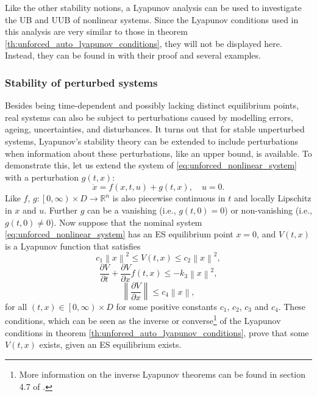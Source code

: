 Like the other stability notions, a Lyapunov analysis can be used to investigate the UB and UUB of nonlinear systems. Since the Lyapunov conditions used in this analysis are very similar to those in theorem \ref{th:unforced_auto_lyapunov_conditions}, they will not be displayed here. Instead, they can be found in \cite{khalilNonlinearControl2015} with their proof and several examples.

\subsubsection{Stability of perturbed systems}

Besides being time-dependent and possibly lacking distinct equilibrium points, real systems can also be subject to perturbations caused by modelling errors, ageing, uncertainties, and disturbances. It turns out that for stable unperturbed systems, Lyapunov's stability theory can be extended to include perturbations when information about these perturbations, like an upper bound, is available. To demonstrate this, let us extend the system of \eqref{eq:unforced_nonlinear_system} with a perturbation $g\left(t, x\right)$:
\begin{equation} \label{eq:perturbed_nonlinear_system}
  \dot{ x }= f \left(x, t, u\right)+ g \left(t, x\right), \quad u = 0.
\end{equation}
Like $f$, $g :\left[0, \infty\right)\times D \rightarrow\mathbb{R}^n$ is also piecewise continuous in $t$ and locally Lipschitz in $x$ and $u$. Further $g$ can be a vanishing (i.e., $g \left( t, 0 \right)= 0$) or non-vanishing (i.e., $g \left(t, 0 \right)\neq 0$). Now suppose that the nominal system \eqref{eq:unforced_nonlinear_system} has an ES equilibrium point $x = 0$, and $V\left(t, x \right)$ is a Lyapunov function that satisfies
\begin{equation}
  c_1 \left\|x\right\|^2 \le V\left(t, x \right) \le c_2 \left\|x \right\|^2,
\end{equation}
\begin{equation} \label{eq:perturbed_lyapunov_condition2}
  \frac{\partial V}{\partial t} + \frac{\partial V}{\partial x}{f \left( t, x \right)} \le - k_3 \left\|x\right\|^2,
\end{equation}
\begin{equation} \label{eq:perturbed_lyapunov_condition3}
  \left\|\frac{\partial V}{\partial x}\right\| \le c_4 \left\|x\right\|,
\end{equation}
for all $\left( t, x \right) \in \left[0, \infty\right) \times D$ for some positive constants $c_1$, $c_2$, $c_3$ and $c_4$. These conditions, which can be seen as the inverse or converse\footnote{More information on the inverse Lyapunov theorems can be found in section 4.7 of \cite{khalilNonlinearSystems2002}.} of the Lyapunov conditions in theorem \ref{th:unforced_auto_lyapunov_conditions}, prove that some $V\left(t, x\right)$ exists, given an ES equilibrium exists.

